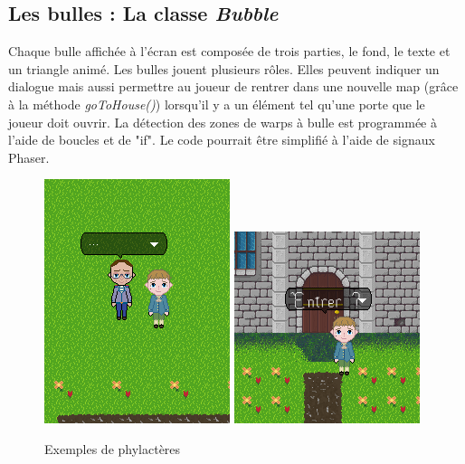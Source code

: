 \documentclass[11pt]{article}
\begin{document}
\begin{appendices}
\subsection{Les bulles : La classe \textit{Bubble}}
 Chaque bulle affichée à l'écran est composée de trois parties, le fond, le texte et un triangle animé. Les bulles jouent plusieurs rôles. Elles peuvent indiquer un dialogue mais aussi permettre au joueur de rentrer dans une nouvelle map (grâce à la méthode \textit{goToHouse()}) lorsqu'il y a un élément tel qu'une porte que le joueur doit ouvrir. La détection des zones de warps à bulle est programmée à l'aide de boucles et de "if". Le code pourrait être simplifié à l'aide de signaux Phaser.
\begin{figure}[H]
\includegraphics[scale=0.5]{bulleDialog}
\includegraphics[scale=0.5]{bulleMaison}
\centering
\caption{Exemples de phylactères}
\end{figure}

\end{appendices}
\end{document}
